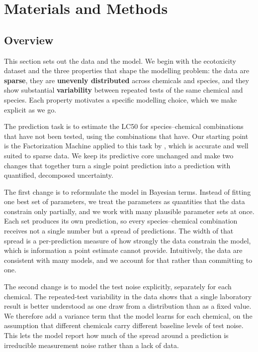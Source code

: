 \section{Materials and Methods}
\subsection{Overview}

This section sets out the data and the model. We begin with the ecotoxicity dataset and the three properties that shape the modelling problem: the data are \textbf{sparse}, they are \textbf{unevenly distributed} across chemicals and species, and they show substantial \textbf{variability} between repeated tests of the same chemical and species. Each property motivates a specific modelling choice, which we make explicit as we go.

The prediction task is to estimate the LC50 for species--chemical combinations that have not been tested, using the combinations that have. Our starting point is the Factorization Machine applied to this task by \citet{PosthumaImprovingHazard}, which is accurate and well suited to sparse data. We keep its predictive core unchanged and make two changes that together turn a single point prediction into a prediction with quantified, decomposed uncertainty.

The first change is to reformulate the model in Bayesian terms. Instead of fitting one best set of parameters, we treat the parameters as quantities that the data constrain only partially, and we work with many plausible parameter sets at once. Each set produces its own prediction, so every species--chemical combination receives not a single number but a spread of predictions. The width of that spread is a per-prediction measure of how strongly the data constrain the model, which is information a point estimate cannot provide. Intuitively, the data are consistent with many models, and we account for that rather than committing to one.

The second change is to model the test noise explicitly, separately for each chemical. The repeated-test variability in the data shows that a single laboratory result is better understood as one draw from a distribution than as a fixed value. We therefore add a variance term that the model learns for each chemical, on the assumption that different chemicals carry different baseline levels of test noise. This lets the model report how much of the spread around a prediction is irreducible measurement noise rather than a lack of data.

